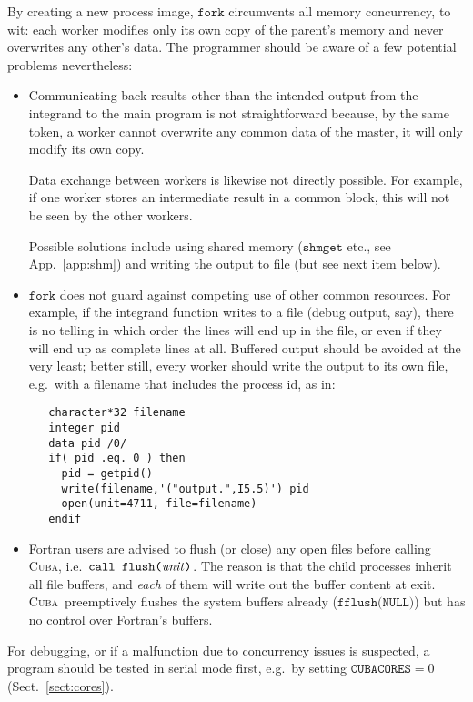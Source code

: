 \documentclass[12pt]{article}
\newcommand\cuba{\textsc{Cuba}}
\newcommand\ie{i.e.\ }
\newcommand\eg{e.g.\ }
\newcommand\Code[1]{\ensuremath{\texttt{#1}}}
\newcommand\Var[1]{\ensuremath{\mathit{#1}}}
\begin{document}
By creating a new process image, \Code{fork} circumvents all memory 
concurrency, to wit: each worker modifies only its own copy of the 
parent's memory and never overwrites any other's data.  The programmer 
should be aware of a few potential problems nevertheless:
\begin{itemize}
\item Communicating back results other than the intended output from the 
integrand to the main program is not straightforward because, by the 
same token, a worker cannot overwrite any common data of the master, it 
will only modify its own copy.

Data exchange between workers is likewise not directly possible.  For 
example, if one worker stores an intermediate result in a common block, 
this will not be seen by the other workers.

Possible solutions include using shared memory (\Code{shmget} etc., see 
App.~\ref{app:shm}) and writing the output to file (but see next item 
below).

\item \Code{fork} does not guard against competing use of other common 
resources.  For example, if the integrand function writes to a file 
(debug output, say), there is no telling in which order the lines will 
end up in the file, or even if they will end up as complete lines at 
all.  Buffered output should be avoided at the very least; better still, 
every worker should write the output to its own file, \eg with a 
filename that includes the process id, as in:
\begin{verbatim}
   character*32 filename
   integer pid
   data pid /0/
   if( pid .eq. 0 ) then  
     pid = getpid()
     write(filename,'("output.",I5.5)') pid
     open(unit=4711, file=filename)
   endif
\end{verbatim}

\item Fortran users are advised to flush (or close) any open files 
before calling \cuba, \ie \Code{call flush(\Var{unit})}.  The reason is 
that the child processes inherit all file buffers, and \emph{each} of 
them will write out the buffer content at exit.  \cuba\ preemptively 
flushes the system buffers already (\Code{fflush(NULL)}) but has no 
control over Fortran's buffers.
\end{itemize}
For debugging, or if a malfunction due to concurrency issues is 
suspected, a program should be tested in serial mode first, \eg by 
setting $\Code{CUBACORES} = 0$ (Sect.~\ref{sect:cores}).
\end{document}
